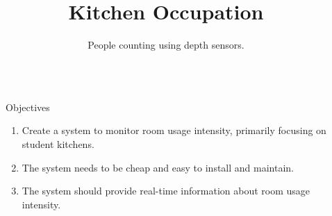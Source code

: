 \documentclass[final,hyperref={pdfpagelabels=false}]{beamer}
\title{\huge Kitchen Occupation} %
\author{People counting using depth sensors.} %
\institute{Department of Electrical Engineering, Linköping University} %
\begin{document}

\begin{frame}[t] %

\begin{columns}[t] %

\begin{column}{.02\textwidth}\end{column} %

\begin{column}{.465\textwidth} %


\begin{block}{Objectives}

\begin{enumerate}
\item Create a system to monitor room usage intensity, primarily focusing on student kitchens.
\item The system needs to be cheap and easy to install and maintain.
\item The system should provide real-time information about room usage intensity.
\end{enumerate}

\end{block}

            
%


\end{column}
\end{columns}
\end{frame}
\end{document}

